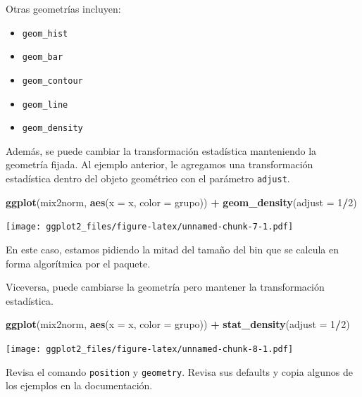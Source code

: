 \documentclass[]{article}
\newenvironment{Shaded}{\begin{snugshade}}{\end{snugshade}}
\newcommand{\KeywordTok}[1]{\textcolor[rgb]{0.13,0.29,0.53}{\textbf{#1}}}
\newcommand{\DataTypeTok}[1]{\textcolor[rgb]{0.13,0.29,0.53}{#1}}
\newcommand{\DecValTok}[1]{\textcolor[rgb]{0.00,0.00,0.81}{#1}}
\newcommand{\StringTok}[1]{\textcolor[rgb]{0.31,0.60,0.02}{#1}}
\newcommand{\OperatorTok}[1]{\textcolor[rgb]{0.81,0.36,0.00}{\textbf{#1}}}
\newcommand{\NormalTok}[1]{#1}
\providecommand{\tightlist}{%
  \setlength{\itemsep}{0pt}\setlength{\parskip}{0pt}}
\begin{document}
Otras geometrías incluyen:

\begin{itemize}
\tightlist
\item
  \texttt{geom\_hist}
\item
  \texttt{geom\_bar}
\item
  \texttt{geom\_contour}
\item
  \texttt{geom\_line}
\item
  \texttt{geom\_density}
\end{itemize}

Además, se puede cambiar la transformación estadística manteniendo la
geometría fijada. Al ejemplo anterior, le agregamos una transformación
estadística dentro del objeto geométrico con el parámetro
\texttt{adjust}.

\begin{Shaded}
\begin{Highlighting}[]
\KeywordTok{ggplot}\NormalTok{(mix2norm, }\KeywordTok{aes}\NormalTok{(}\DataTypeTok{x =}\NormalTok{ x, }\DataTypeTok{color =}\NormalTok{ grupo)) }\OperatorTok{+}\StringTok{ }\KeywordTok{geom_density}\NormalTok{(}\DataTypeTok{adjust =} \DecValTok{1}\OperatorTok{/}\DecValTok{2}\NormalTok{)}
\end{Highlighting}
\end{Shaded}

\texttt{[image: ggplot2\_files/figure-latex/unnamed-chunk-7-1.pdf]}

En este caso, estamos pidiendo la mitad del tamaño del bin que se
calcula en forma algorítmica por el paquete.

Viceversa, puede cambiarse la geometría pero mantener la transformación
estadística.

\begin{Shaded}
\begin{Highlighting}[]
\KeywordTok{ggplot}\NormalTok{(mix2norm, }\KeywordTok{aes}\NormalTok{(}\DataTypeTok{x =}\NormalTok{ x, }\DataTypeTok{color =}\NormalTok{ grupo)) }\OperatorTok{+}\StringTok{ }\KeywordTok{stat_density}\NormalTok{(}\DataTypeTok{adjust =} \DecValTok{1}\OperatorTok{/}\DecValTok{2}\NormalTok{)}
\end{Highlighting}
\end{Shaded}

\texttt{[image: ggplot2\_files/figure-latex/unnamed-chunk-8-1.pdf]}

Revisa el comando \texttt{position} y \texttt{geometry}. Revisa sus
defaults y copia algunos de los ejemplos en la documentación.
\end{document}
